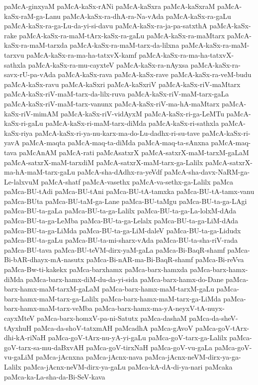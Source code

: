 {paMcA-ginxyaM
paMcA-kaSx-rANi
paMcA-kaSxra
paMcA-kaSxraM
paMcA-kaSx-raM-ga-Lanu
paMcA-kaSx-ra-dhA-ra-Na-vAda
paMcA-kaSx-ra-gaLu
paMcA-kaSx-ra-ga-Lu-da-yi-si-davu
paMcA-kaSx-ra-ja-pa-satxthA
paMcA-kaSx-rake
paMcA-kaSx-ra-maM-tArx-kaSx-ra-gaLu
paMcA-kaSx-ra-maMtarx
paMcA-kaSx-ra-maM-tarxda
paMcA-kaSx-ra-maM-tarx-da-lilxna
paMcA-kaSx-ra-maM-tarxvu
paMcA-kaSx-ra-ma-ha-tatxvX-kamf
paMcA-kaSx-ra-ma-ha-tatxvX-sathxla
paMcA-kaSx-ra-mu-cayxteV
paMcA-kaSx-ra-nAyxsa
paMcA-kaSx-ra-savx-rU-pa-vAda
paMcA-kaSx-rava
paMcA-kaSx-rave
paMcA-kaSx-ra-veM-budu
paMcA-kaSx-ravu
paMcA-kaSxri
paMcA-kaSxriV
paMcA-kaSx-riV-maMtarx
paMcA-kaSx-riV-maM-tarx-da-lilx-ruva
paMcA-kaSx-riV-maM-tarx-gaLa
paMcA-kaSx-riV-maM-tarx-vanunx
paMcA-kaSx-riV-ma-hA-maMtarx
paMcA-kaSx-riV-mimAM
paMcA-kaSx-riV-vidAyxM
paMcA-kaSx-ri-ga-LeMTu
paMcA-kaSx-ri-gaLu
paMcA-kaSx-ri-maM-tarx-diMda
paMcA-kaSx-ri-sathxla
paMcA-kaSx-riya
paMcA-kaSx-ri-ya-nu-karx-ma-do-Lu-dadhx-ri-su-tave
paMcA-kaSx-ri-yavA
paMcA-maqta
paMcA-maq-ta-diMda
paMcA-maq-ta-sAnxna
paMcA-maq-tava
paMcAnAM
paMcA-rati
paMcAsatxrX
paMcA-satxrX-maM-tarxM-gaLaM
paMcA-satxrX-maM-tarxdiM
paMcA-satxrX-maM-tarx-ga-Lalilx
paMcA-satxrX-ma-hA-maM-tarx-gaLu
paMcA-sha-dAdhx-ra-yeVdf
paMcA-sha-davx-NaRM-ga-Le-lalxvuM
paMcA-shatf
paMcA-vasethx
paMcA-va-sethx-ga-Lalilx
paMca
paMca-BU-tAdi
paMca-BU-tAni
paMca-BU-tA-tamxka
paMca-BU-tA-tamx-vanu
paMca-BUta
paMca-BU-taM-ga-Lane
paMca-BU-taMgu
paMca-BU-ta-ga-LAgi
paMca-BU-ta-gaLa
paMca-BU-ta-ga-Lalilx
paMca-BU-ta-ga-La-lolxM-dAda
paMca-BU-ta-ga-LeMba
paMca-BU-ta-ga-Lelalx
paMca-BU-ta-ga-LiM-dAda
paMca-BU-ta-ga-LiMda
paMca-BU-ta-ga-LiM-daleV
paMca-BU-ta-ga-Lidudx
paMca-BU-ta-gaLu
paMca-BU-ta-mi-sharx-vAda
paMca-BU-ta-sha-riV-rada
paMca-BU-tava
paMca-BU-teVM-dirx-yaM-gaLa
paMca-Bi-BaqR-shamf
paMca-Bi-bAR-dhayx-mA-nasutx
paMca-Bi-nAR-ma-Bi-BaqR-shamf
paMca-Bi-reVva
paMca-Bw-ti-kakekx
paMca-barxhamx
paMca-barx-hamxda
paMca-barx-hamx-diMda
paMca-barx-hamx-diM-du-da-yi-sida
paMca-barx-hamx-do-Dane
paMca-barx-hamx-maM-tarxM-gaLaM
paMca-barx-hamx-maM-tarxM-gaLu
paMca-barx-hamx-maM-tarx-ga-Lalilx
paMca-barx-hamx-maM-tarx-ga-LiMda
paMca-barx-hamx-maM-tarx-veMba
paMca-barx-hamx-ma-yA-neyxV-tA-nuyx-cayxMteV
paMca-barx-homxV-pa-ni-Satutx
paMca-dashaM
paMca-da-sheV-tAyxhuH
paMca-da-shoV-tatxmAH
paMcadhA
paMca-gAvoV
paMca-goV-tArx-dhi-kA-riNaH
paMca-goV-tArx-nu-yA-yi-gaLu
paMca-goV-tarx-ga-Lalilx
paMca-goV-tarx-sa-mu-daBxvAH
paMca-goV-tirxNaH
paMca-goV-vu-gaLa
paMca-goV-vu-gaLiM
paMca-jAcnxna
paMca-jAcnx-nava
paMca-jAcnx-neVM-dirx-ya-ga-Lalilx
paMca-jAcnx-neVM-dirx-ya-gaLu
paMca-kA-dA-di-ya-nari
paMcaka
paMca-ka-La-sha-da-Bi-SeV-kava
}
